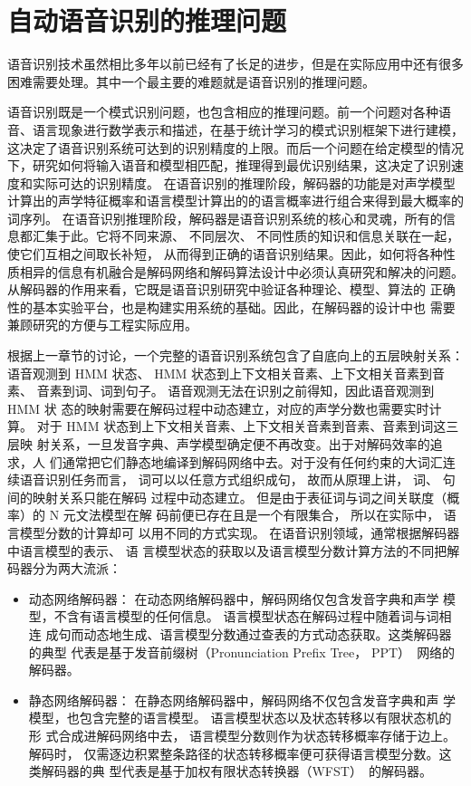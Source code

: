 \section{自动语音识别的推理问题}
\label{chap:intro0-inf}

语音识别技术虽然相比多年以前已经有了长足的进步，但是在实际应用中还有很多
困难需要处理。其中一个最主要的难题就是语音识别的推理问题。

语音识别既是一个模式识别问题，也包含相应的推理问题。前一个问题对各种语音、语言现象进行数学表示和描述，在基于统计学习的模式识别框架下进行建模，这决定了语音识别系统可达到的识别精度的上限。而后一个问题在给定模型的情况下，研究如何将输入语音和模型相匹配，推理得到最优识别结果，这决定了识别速度和实际可达的识别精度。
%
在语音识别的推理阶段，解码器的功能是对声学模型计算出的声学特征概率和语言模型计算出的的语言概率进行组合来得到最大概率的词序列。
%
在语音识别推理阶段，解码器是语音识别系统的核心和灵魂，所有的信息都汇集于此。它将不同来源、 不同层次、 不同性质的知识和信息关联在一起，使它们互相之间取长补短， 从而得到正确的语音识别结果。因此，如何将各种性质相异的信息有机融合是解码网络和解码算法设计中必须认真研究和解决的问题。
从解码器的作用来看，它既是语音识别研究中验证各种理论、模型、算法的
正确性的基本实验平台，也是构建实用系统的基础。因此，在解码器的设计中也
需要兼顾研究的方便与工程实际应用。

根据上一章节的讨论，一个完整的语音识别系统包含了自底向上的五层映射关系：
语音观测到 HMM 状态、 HMM 状态到上下文相关音素、上下文相关音素到音素、
音素到词、词到句子。 语音观测无法在识别之前得知，因此语音观测到 HMM 状
态的映射需要在解码过程中动态建立，对应的声学分数也需要实时计算。
对于 HMM 状态到上下文相关音素、上下文相关音素到音素、音素到词这三层映
射关系，一旦发音字典、声学模型确定便不再改变。出于对解码效率的追求，人
们通常把它们静态地编译到解码网络中去。对于没有任何约束的大词汇连续语音识别任务而言，
词可以以任意方式组织成句， 故而从原理上讲， 词、 句间的映射关系只能在解码
过程中动态建立。 但是由于表征词与词之间关联度（概率）的 N 元文法模型在解
码前便已存在且是一个有限集合， 所以在实际中， 语言模型分数的计算却可
以用不同的方式实现。 在语音识别领域，通常根据解码器中语言模型的表示、 语
言模型状态的获取以及语言模型分数计算方法的不同把解码器分为两大流派：
\begin{itemize}
\item 动态网络解码器： 在动态网络解码器中，解码网络仅包含发音字典和声学
模型，不含有语言模型的任何信息。 语言模型状态在解码过程中随着词与词相连
成句而动态地生成、语言模型分数通过查表的方式动态获取。这类解码器的典型
代表是基于发音前缀树（Pronunciation Prefix Tree， PPT）~\cite{woodland1994large}网络的解码器。
\item 静态网络解码器： 在静态网络解码器中，解码网络不仅包含发音字典和声
学模型，也包含完整的语言模型。 语言模型状态以及状态转移以有限状态机的形
式合成进解码网络中去， 语言模型分数则作为状态转移概率存储于边上。解码时，
仅需逐边积累整条路径的状态转移概率便可获得语言模型分数。这类解码器的典
型代表是基于加权有限状态转换器（WFST）~\cite{mohri2002weighted}的解码器。
\end{itemize}

